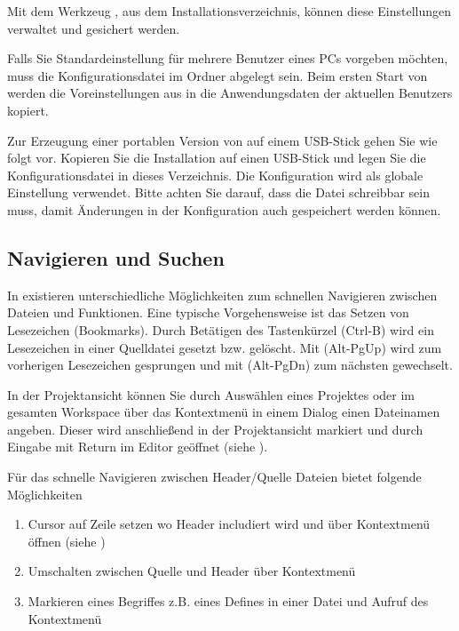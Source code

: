 Mit dem Werkzeug , aus dem \codeblocks Installationsverzeichnis, können diese Einstellungen verwaltet und gesichert werden.

Falls Sie Standardeinstellung für mehrere Benutzer eines PCs vorgeben möchten, muss die Konfigurationsdatei  im Ordner  abgelegt sein. Beim ersten Start von \codeblocks werden die Voreinstellungen aus  in die Anwendungsdaten der aktuellen Benutzers kopiert.

Zur Erzeugung einer portablen Version von \codeblocks auf einem USB-Stick gehen Sie wie folgt vor. Kopieren Sie die \codeblocks Installation auf einen USB-Stick und legen Sie die Konfigurationsdatei  in dieses Verzeichnis. Die Konfiguration wird als globale Einstellung verwendet. Bitte achten Sie darauf, dass die Datei schreibbar sein muss, damit Änderungen in der Konfiguration auch gespeichert werden können.

\subsection{Navigieren und Suchen}

In \codeblocks existieren unterschiedliche Möglichkeiten zum schnellen Navigieren zwischen Dateien und Funktionen. Eine typische Vorgehensweise ist das Setzen von Lesezeichen (Bookmarks). Durch Betätigen des Tastenkürzel (Ctrl-B) wird ein Lesezeichen in einer Quelldatei gesetzt bzw. gelöscht. Mit (Alt-PgUp) wird zum vorherigen Lesezeichen gesprungen und mit (Alt-PgDn) zum nächsten gewechselt.

In der Projektansicht können Sie durch Auswählen eines Projektes oder im gesamten Workspace über das Kontextmenü  in einem Dialog einen Dateinamen angeben. Dieser wird anschließend in der Projektansicht markiert und durch Eingabe mit Return im Editor geöffnet (siehe ).


Für das schnelle Navigieren zwischen Header/Quelle Dateien bietet \codeblocks folgende Möglichkeiten

\begin{enumerate}
\item Cursor auf Zeile setzen wo Header includiert wird und über Kontextmenü  öffnen (siehe )
\item Umschalten zwischen Quelle und Header über Kontextmenü 
\item Markieren eines Begriffes z.B. eines Defines in einer Datei und Aufruf des Kontextmenü 
\end{enumerate}

